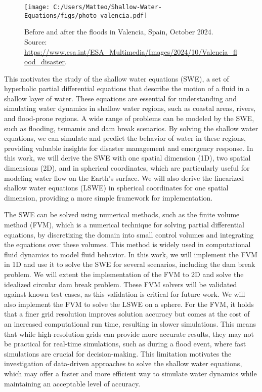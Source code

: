 \begin{figure}
    \centering
    \texttt{[image: C:/Users/Matteo/Shallow-Water-Equations/figs/photo\_valencia.pdf]}
    \caption{Before and after the floods in Valencia, Spain, October 2024.\\
            Source: \url{https://www.esa.int/ESA_Multimedia/Images/2024/10/Valencia_flood_disaster}.}\label{fig:valencia_flood}
\end{figure}
This motivates the study of the shallow water equations (SWE), a set of hyperbolic partial differential equations that describe the motion of a fluid in a shallow layer of water.
These equations are essential for understanding and simulating water dynamics in shallow water regions, such as coastal areas, rivers, and flood-prone regions.
A wide range of problems can be modeled by the SWE, such as flooding, tsunamis and dam break scenarios.
By solving the shallow water equations, we can simulate and predict the behavior of water in these regions, providing valuable insights for disaster management and emergency response.
In this work, we will derive the SWE with one spatial dimension (1D), two spatial dimensions (2D), and in spherical coordinates, which are particularly useful for modeling water flow on the Earth's surface.
We will also derive the linearized shallow water equations (LSWE) in spherical coordinates for one spatial dimension, providing a more simple framework for implementation.

The SWE can be solved using numerical methods, such as the finite volume method (FVM), which is a numerical technique for solving partial differential equations, by discretizing the domain into small control volumes and integrating the equations over these volumes.
This method is widely used in computational fluid dynamics to model fluid behavior.
In this work, we will implement the FVM in 1D and use it to solve the SWE for several scenarios, including the dam break problem.
We will extent the implementation of the FVM to 2D and solve the idealized circular dam break problem.
These FVM solvers will be validated against known test cases, as this validation is critical for future work.
We will also implement the FVM to solve the LSWE on a sphere.
For the FVM, it holds that a finer grid resolution improves solution accuracy but comes at the cost of an increased computational run time, resulting in slower simulations.
This means that while high-resolution grids can provide more accurate results, they may not be practical for real-time simulations, such as during a flood event, where fast simulations are crucial for decision-making.
This limitation motivates the investigation of data-driven approaches to solve the shallow water equations, which may offer a faster and more efficient way to simulate water dynamics while maintaining an acceptable level of accuracy.

